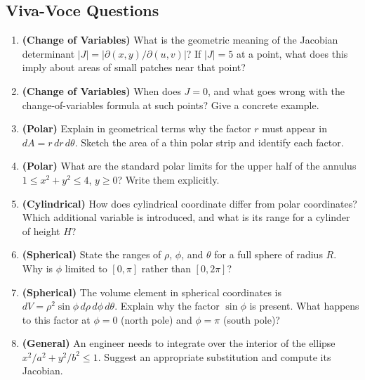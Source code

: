 \documentclass[12pt,a4paper]{article}
\begin{document}
\subsection*{Viva-Voce Questions}

\begin{enumerate}[label=\textbf{V\arabic*.}, leftmargin=2em]

\item \textbf{(Change of Variables)} What is the geometric meaning of the Jacobian determinant
  $|J| = |\partial(x,y)/\partial(u,v)|$? If $|J|=5$ at a point, what does this imply about areas
  of small patches near that point?

\item \textbf{(Change of Variables)} When does $J = 0$, and what goes wrong with the
  change-of-variables formula at such points? Give a concrete example.

\item \textbf{(Polar)} Explain in geometrical terms why the factor $r$ must appear in
  $dA = r\,dr\,d\theta$. Sketch the area of a thin polar strip and identify each factor.

\item \textbf{(Polar)} What are the standard polar limits for the upper half of the annulus
  $1 \leq x^2+y^2 \leq 4$, $y \geq 0$? Write them explicitly.

\item \textbf{(Cylindrical)} How does cylindrical coordinate differ from polar coordinates?
  Which additional variable is introduced, and what is its range for a cylinder of height $H$?

\item \textbf{(Spherical)} State the ranges of $\rho$, $\phi$, and $\theta$ for a full sphere
  of radius $R$. Why is $\phi$ limited to $[0,\pi]$ rather than $[0, 2\pi]$?

\item \textbf{(Spherical)} The volume element in spherical coordinates is
  $dV = \rho^2\sin\phi\,d\rho\,d\phi\,d\theta$. Explain why the factor $\sin\phi$ is present.
  What happens to this factor at $\phi = 0$ (north pole) and $\phi = \pi$ (south pole)?

\item \textbf{(General)} An engineer needs to integrate over the interior of the ellipse
  $x^2/a^2 + y^2/b^2 \leq 1$. Suggest an appropriate substitution and compute its Jacobian.

\end{enumerate}
\end{document}

